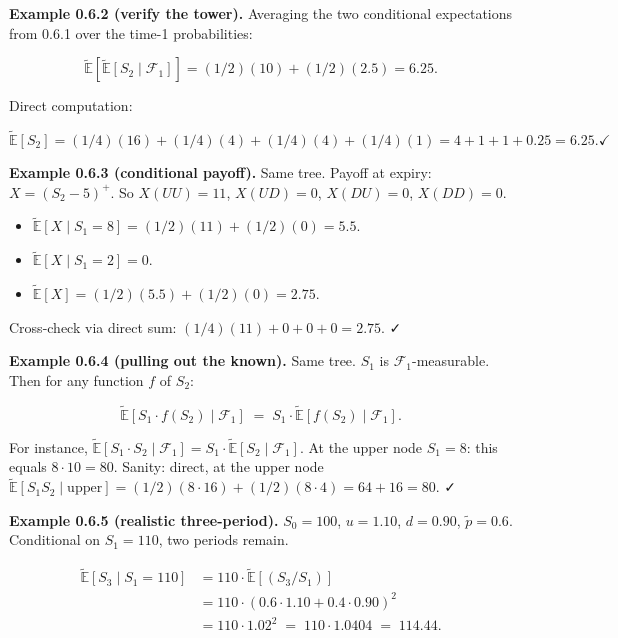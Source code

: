 \documentclass[
  10pt,
  twoside]{book}
\providecommand{\tightlist}{%
  \setlength{\itemsep}{0pt}\setlength{\parskip}{0pt}}
\begin{document}
\textbf{Example 0.6.2 (verify the tower).} Averaging the two conditional
expectations from 0.6.1 over the time-1 probabilities:

\[\tilde{\mathbb{E}}\!\left[\tilde{\mathbb{E}}[S_2 \mid \mathcal{F}_1]\right] = (1/2)(10) + (1/2)(2.5) = 6.25.\]

Direct computation:

\[\tilde{\mathbb{E}}[S_2] = (1/4)(16) + (1/4)(4) + (1/4)(4) + (1/4)(1) = 4 + 1 + 1 + 0.25 = 6.25. ✓\]

\textbf{Example 0.6.3 (conditional payoff).} Same tree. Payoff at
expiry: \(X = (S_2 - 5)^+\). So \(X(UU) = 11\), \(X(UD) = 0\),
\(X(DU) = 0\), \(X(DD) = 0\).

\begin{itemize}
\tightlist
\item
  \(\tilde{\mathbb{E}}[X \mid S_1 = 8] = (1/2)(11) + (1/2)(0) = 5.5\).
\item
  \(\tilde{\mathbb{E}}[X \mid S_1 = 2] = 0\).
\item
  \(\tilde{\mathbb{E}}[X] = (1/2)(5.5) + (1/2)(0) = 2.75\).
\end{itemize}

Cross-check via direct sum: \((1/4)(11) + 0 + 0 + 0 = 2.75\). ✓

\textbf{Example 0.6.4 (pulling out the known).} Same tree. \(S_1\) is
\(\mathcal{F}_1\)-measurable. Then for any function \(f\) of \(S_2\):

\[\tilde{\mathbb{E}}[S_1 \cdot f(S_2) \mid \mathcal{F}_1] \;=\; S_1 \cdot \tilde{\mathbb{E}}[f(S_2) \mid \mathcal{F}_1].\]

For instance,
\(\tilde{\mathbb{E}}[S_1 \cdot S_2 \mid \mathcal{F}_1] = S_1 \cdot \tilde{\mathbb{E}}[S_2 \mid \mathcal{F}_1]\).
At the upper node \(S_1 = 8\): this equals \(8 \cdot 10 = 80\). Sanity:
direct, at the upper node
\(\tilde{\mathbb{E}}[S_1 S_2 \mid \text{upper}] = (1/2)(8 \cdot 16) + (1/2)(8 \cdot 4) = 64 + 16 = 80\).
✓

\textbf{Example 0.6.5 (realistic three-period).} \(S_0 = 100\),
\(u = 1.10\), \(d = 0.90\), \(\tilde p = 0.6\). Conditional on
\(S_1 = 110\), two periods remain.

\[
\begin{aligned}
\tilde{\mathbb{E}}[S_3 \mid S_1 = 110]
&= 110 \cdot \tilde{\mathbb{E}}[(S_3/S_1)] \\
&= 110 \cdot (0.6 \cdot 1.10 + 0.4 \cdot 0.90)^2 \\
&= 110 \cdot 1.02^2 \;=\; 110 \cdot 1.0404 \;=\; 114.44.
\end{aligned}
\]
\end{document}
